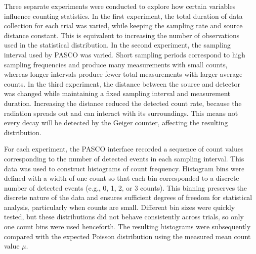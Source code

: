 \documentclass[letterpaper,12pt]{article}
\begin{document}
Three separate experiments were conducted to explore how certain variables influence counting statistics. In the first experiment, the total duration of data collection for each trial was varied, while keeping the sampling rate and source distance constant. This is equivalent to increasing the number of observations used in the statistical distribution. In the second experiment, the sampling interval used by PASCO was varied. Short sampling periods correspond to high sampling frequencies and produce many measurements with small counts, whereas longer intervals produce fewer total measurements with larger average counts. In the third experiment, the distance between the source and detector was changed while maintaining a fixed sampling interval and measurement duration. Increasing the distance reduced the detected count rate, because the radiation spreads out and can interact with its surroundings. This means not every decay will be detected by the Geiger counter, affecting the resulting distribution. 

For each experiment, the PASCO interface recorded a sequence of count values corresponding to the number of detected events in each sampling interval. This data was used to construct histograms of count frequency. Histogram bins were defined with a width of one count so that each bin corresponded to a discrete number of detected events (e.g., 0, 1, 2, or 3 counts). This binning preserves the discrete nature of the data and ensures sufficient degrees of freedom for statistical analysis, particularly when counts are small. Different bin sizes were quickly tested, but these distributions did not behave consistently across trials, so only one count bins were used henceforth. The resulting histograms were subsequently compared with the expected Poisson distribution using the measured mean count value $\mu$. 



\end{document}
